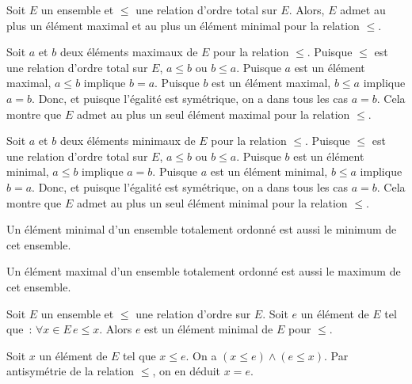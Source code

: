     \done

\blank[medium]

\blank[medium]

\noindent{} Soit $E$ un ensemble et $\leq$ une relation d'ordre total sur $E$. 
    Alors, $E$ admet au plus un élément maximal et au plus un élément minimal pour la relation $\leq$. 

\blank[medium]

\noindent{} 
    Soit $a$ et $b$ deux éléments maximaux de $E$ pour la relation $\leq$.
    Puisque $\leq$ est une relation d'ordre total sur $E$, $a \leq b$ ou $b \leq a$. 
    Puisque $a$ est un élément maximal, $a \leq b$ implique $b = a$.
    Puisque $b$ est un élément maximal, $b \leq a$ implique $a = b$.
    Donc, et puisque l'égalité est symétrique, on a dans tous les cas $a = b$.
    Cela montre que $E$ admet au plus un seul élément maximal pour la relation $\leq$.
    
    Soit $a$ et $b$ deux éléments minimaux de $E$ pour la relation $\leq$.
    Puisque $\leq$ est une relation d'ordre total sur $E$, $a \leq b$ ou $b \leq a$. 
    Puisque $b$ est un élément minimal, $a \leq b$ implique $a = b$.
    Puisque $a$ est un élément minimal, $b \leq a$ implique $b = a$.
    Donc, et puisque l'égalité est symétrique, on a dans tous les cas $a = b$.
    Cela montre que $E$ admet au plus un seul élément minimal pour la relation $\leq$.

   \done 

\blank[medium]

\noindent {} 
\startitemize[nowhite]
    \item Un élément minimal d'un ensemble totalement ordonné est aussi le minimum de cet ensemble.
    \item Un élément maximal d'un ensemble totalement ordonné est aussi le maximum de cet ensemble.
\stopitemize

\blank[medium]

\noindent{} Soit $E$ un ensemble et $\leq$ une relation d'ordre sur $E$. 
    Soit $e$ un élément de $E$ tel que : $\forall x \in E \, e \leq x$. 
    Alors $e$ est un élément minimal de $E$ pour $\leq$.

\blank[medium]

\noindent{} 
    Soit $x$ un élément de $E$ tel que $x \leq e$. 
    On a $(x \leq e) \wedge (e \leq x)$. 
    Par antisymétrie de la relation $\leq$, on en déduit $x = e$.

